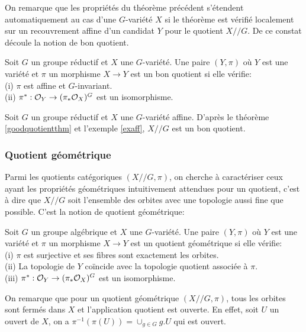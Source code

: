 On remarque que les propriétés du théorème précédent s'étendent automatiquement au cas d'une $G$-variété $X$ si le théorème est vérifié localement sur un recouvrement affine d'un candidat $Y$ pour le quotient $X//G$. De ce constat découle la notion de bon quotient.

\begin{defn}
Soit $G$ un groupe réductif et $X$ une $G$-variété. Une paire $(Y, \pi)$ où $Y$ est une variété et $\pi$ un morphisme $X\rightarrow Y$ est un bon quotient si elle vérifie:\\
(i) $\pi$ est affine et $G$-invariant.\\
(ii) $\pi^*:\mathcal{O}_Y \rightarrow (\pi_*\mathcal{O}_X)^G$ est un isomorphisme.
\end{defn}

\begin{ex}
Soit $G$ un groupe réductif et $X$ une $G$-variété affine. D'après le théorème \ref{goodquotientthm} et l'exemple \ref{exaff}, $X//G$ est un bon quotient.
\end{ex}


\subsubsection{Quotient géométrique}

Parmi les quotients catégoriques $(X//G,\pi)$, on cherche à caractériser ceux ayant les propriétés géométriques intuitivement attendues pour un quotient, c'est à dire que $X//G$ soit l'ensemble des orbites avec une topologie aussi fine que possible. C'est la notion de quotient géométrique:

\begin{defn}
Soit $G$ un groupe algébrique et $X$ une $G$-variété. Une paire $(Y, \pi)$ où $Y$ est une variété et $\pi$ un morphisme $X\rightarrow Y$ est un quotient géométrique si elle vérifie:\\
(i) $\pi$ est surjective et ses fibres sont exactement les orbites.\\
(ii) La topologie de $Y$ coïncide avec la topologie quotient associée à $\pi$.\\
(iii) $\pi^*:\mathcal{O}_Y \rightarrow (\pi_*\mathcal{O}_X)^G$ est un isomorphisme.
\end{defn}

On remarque que pour un quotient géométrique $(X//G, \pi)$, tous les orbites sont fermés dans $X$ et l'application quotient est ouverte. En effet, soit $U$ un ouvert de $X$, on a $\pi^{-1}(\pi(U))=\cup_{g\in G}g.U$ qui est ouvert.

